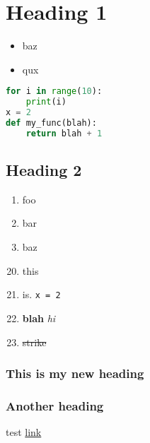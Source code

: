 \documentclass{article}
\begin{document}
\section{Heading 1}
\begin{itemize}
    \item baz
    \item qux
\end{itemize}

\begin{lstlisting}[language=python, style=myStyle]
for i in range(10):
    print(i)
x = 2
def my_func(blah):
    return blah + 1
\end{lstlisting}

\subsection{Heading 2}
\begin{enumerate}
    \setcounter{enumi}{0}
    \item foo
    \item bar
    \item baz
\end{enumerate}

\begin{enumerate}
    \setcounter{enumi}{19}
    \item this
    \item is. \verb|x = 2|
    \item \textbf{blah} \textit{hi}
    \item \sout{strike}
\end{enumerate}

\subsubsection{This is my new heading}
\subsubsection{Another heading}
test \href{https://duckduckgo.com}{link}
\end{document}
